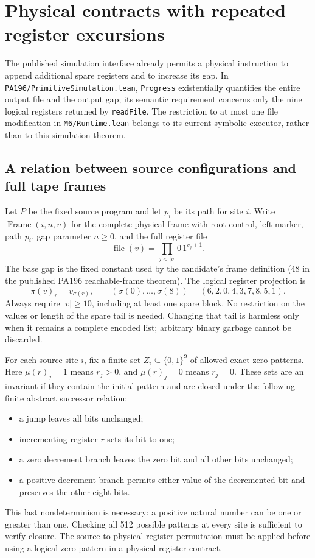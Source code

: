 \section{Physical contracts with repeated register excursions}
\label{sec:repeated-register-excursions}

The published simulation interface already permits a physical instruction
to append additional spare registers and to increase its gap.  In
\texttt{PA196/PrimitiveSimulation.lean}, \texttt{Progress} existentially
quantifies the entire output file and the output gap; its semantic
requirement concerns only the nine logical registers returned by
\texttt{readFile}.  The restriction to at most one file modification in
\texttt{M6/Runtime.lean} belongs to its current symbolic executor, rather
than to this simulation theorem.

\subsection{A relation between source configurations and full tape frames}

Let $P$ be the fixed source program and let $p_i$ be its path for site $i$.
Write $\operatorname{Frame}(i,n,v)$ for the complete physical frame with
root control, left marker, path $p_i$, gap parameter $n\geq0$, and the
full register file
\[
 \operatorname{file}(v)=\prod_{j<|v|}0\,1^{v_j+1}.
\]
The base gap is the fixed constant used by the candidate's frame
definition (48 in the published PA196 reachable-frame theorem).
The logical register projection is
\[
 \pi(v)_r=v_{\sigma(r)},\qquad
 (\sigma(0),\ldots,\sigma(8))=(6,2,0,4,3,7,8,5,1).
\]
Always require $|v|\geq10$, including at least one spare block.  No
restriction on the values or length of the spare tail is needed.
Changing that tail is harmless only when it remains a complete encoded
list; arbitrary binary garbage cannot be discarded.

For each source site $i$, fix a finite set
$Z_i\subseteq\{0,1\}^9$ of allowed exact zero patterns.  Here
$\mu(r)_j=1$ means $r_j>0$, and $\mu(r)_j=0$ means $r_j=0$.
These sets are an invariant if they contain the initial pattern and
are closed under the following finite abstract successor relation:
\begin{itemize}
\item a jump leaves all bits unchanged;
\item incrementing register $r$ sets its bit to one;
\item a zero decrement branch leaves the zero bit and all other bits unchanged;
\item a positive decrement branch permits either value of the decremented
bit and preserves the other eight bits.
\end{itemize}
This last nondeterminism is necessary: a positive natural number can be
one or greater than one.  Checking all 512 possible patterns at every
site is sufficient to verify closure.  The source-to-physical register
permutation must be applied before using a logical zero pattern in a
physical register contract.

